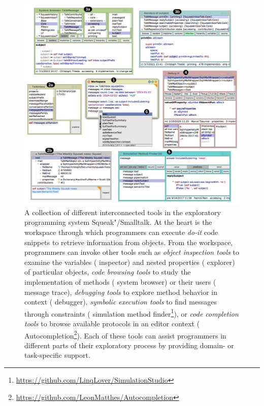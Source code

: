 \begin{figure}
	\begin{minipage}{\textwidth}
		\centering
		\includegraphics[width=\textwidth]{02_expsys/squeak_tools.png}
		\caption[A collection of \emph{exploratory programming tools} in the Squeak"/Smalltalk system.]{
			A collection of different interconnected tools in the exploratory programming system Squeak"/Smalltalk.
			At the heart is the workspace  through which programmers can execute \emph{do-it} code snippets to retrieve information from objects.
			From the workspace, programmers can invoke other tools such as \emph{object inspection tools} to examine the variables ( inspector) and nested properties ( explorer) of particular objects, \emph{code browsing tools} to study the implementation of methods ( system browser) or their users ( message trace), \emph{debugging tools} to explore method behavior in context ( debugger), \emph{symbolic execution tools} to find messages through constraints ( simulation method finder\footnote{\url{https://github.com/LinqLover/SimulationStudio}}), or \emph{code completion tools} to browse available protocols in an editor context ( Autocompletion\footnote{\url{https://github.com/LeonMatthes/Autocompletion}}).
			Each of these tools can assist programmers in different parts of their exploratory process by providing domain- or task-specific support.
		}
		\label{fig:background/expsys/squeak_tools}
	\end{minipage}
\end{figure}

